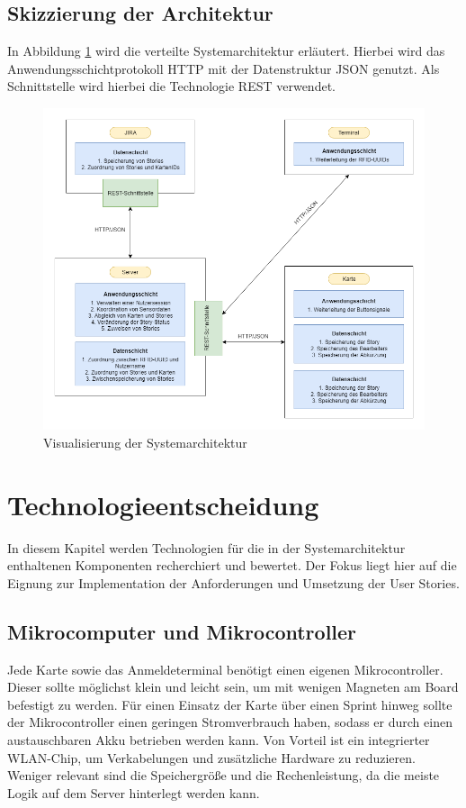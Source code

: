 \documentclass[12pt,titlepage]{scrartcl}
\begin{document}
		\subsection{Skizzierung der Architektur}
		In Abbildung \ref{fig:Architekturskizze} wird die verteilte Systemarchitektur erläutert. Hierbei wird das Anwendungsschichtprotokoll HTTP mit der Datenstruktur JSON genutzt. Als Schnittstelle wird hierbei die Technologie REST verwendet.  \\
		\begin{figure}[htbp] 
  			\centering
    		\includegraphics[height=0.55\textheight]{Architekturdiagramm}
  			\caption{Visualisierung der Systemarchitektur}
  			\label{fig:Architekturskizze}
		\end{figure}
	\newpage	
	\section{Technologieentscheidung}
	In diesem Kapitel werden Technologien für die in der Systemarchitektur enthaltenen Komponenten recherchiert und bewertet. Der Fokus liegt hier auf die Eignung zur Implementation der Anforderungen und Umsetzung der User Stories.
		\subsection{Mikrocomputer und Mikrocontroller}
		Jede Karte sowie das Anmeldeterminal benötigt einen eigenen Mikrocontroller. Dieser sollte möglichst klein und leicht sein, um mit wenigen Magneten am Board befestigt zu werden. Für einen Einsatz der Karte über einen Sprint hinweg sollte der Mikrocontroller einen geringen Stromverbrauch haben, sodass er durch einen austauschbaren Akku betrieben werden kann. Von Vorteil ist ein integrierter WLAN-Chip, um Verkabelungen und zusätzliche Hardware zu reduzieren. Weniger relevant sind die Speichergröße und die Rechenleistung, da die meiste Logik auf dem Server hinterlegt werden kann. 
\end{document}
